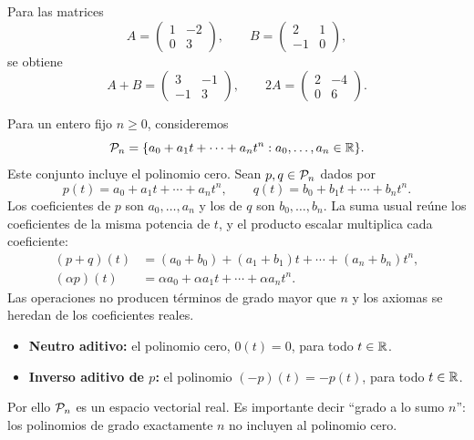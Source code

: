 \documentclass[compacto,10pt]{pubciencias-notas}
\renewenvironment{defi}[1][]
    {\begin{recuadrocti}[nombre=#1,tipo=Definición,contador=defi,
        color=colordef,nobreak=false,needspace=0pt,
        splittopskip=\topskip,splitbottomskip=0pt]}
    {\end{recuadrocti}}
\begin{document}
\begin{ejem}\label{sem05cl02:matrices}
    Para las matrices
    \[
        A=\begin{pmatrix}1&-2\\0&3\end{pmatrix},\qquad
        B=\begin{pmatrix}2&1\\-1&0\end{pmatrix},
    \]
    se obtiene
    \[
        A+B=\begin{pmatrix}3&-1\\-1&3\end{pmatrix},\qquad
        2A=\begin{pmatrix}2&-4\\0&6\end{pmatrix}.
    \]
\end{ejem}

\begingroup
\renewenvironment{defi}[1][]
    {\begin{recuadrocti}[nombre=#1,tipo=Definición,contador=defi,
        color=colordef,nobreak=true]}
    {\end{recuadrocti}}
\begin{defi}[Espacio de polinomios reales]
    Para un entero fijo $n\ge0$, consideremos
    \[
        \mathcal{P}_n=\{a_0+a_1t+\cdots+a_nt^n:a_0,\ldots,a_n\in\mathbb{R}\}.
    \]
    Este conjunto incluye el polinomio cero. Sean $p,q\in\mathcal{P}_n$ dados por
    \[
        p(t)=a_0+a_1t+\cdots+a_nt^n,\qquad
        q(t)=b_0+b_1t+\cdots+b_nt^n.
    \]
    Los coeficientes de $p$ son $a_0,\ldots,a_n$ y los de $q$ son
    $b_0,\ldots,b_n$. La suma usual reúne los coeficientes de la misma
    potencia de $t$, y el producto escalar multiplica cada coeficiente:
    \begin{align*}
        (p+q)(t)&=(a_0+b_0)+(a_1+b_1)t+\cdots+(a_n+b_n)t^n,\\
        (\alpha p)(t)&=\alpha a_0+\alpha a_1t+\cdots+\alpha a_nt^n.
    \end{align*}
    Las operaciones no producen términos de grado mayor que $n$ y los
    axiomas se heredan de los coeficientes reales.
    \begin{itemize}
        \item \textbf{Neutro aditivo:} el polinomio cero, $0(t)=0$, para todo $t\in\mathbb{R}$.
        \item \textbf{Inverso aditivo de $p$:} el polinomio
              $(-p)(t)=-p(t)$, para todo $t\in\mathbb{R}$.
    \end{itemize}
    Por ello $\mathcal{P}_n$ es un espacio
    vectorial real. Es importante decir ``grado a lo sumo $n$'': los
    polinomios de grado exactamente $n$ no incluyen al polinomio cero.
\end{defi}
\endgroup
\end{document}
